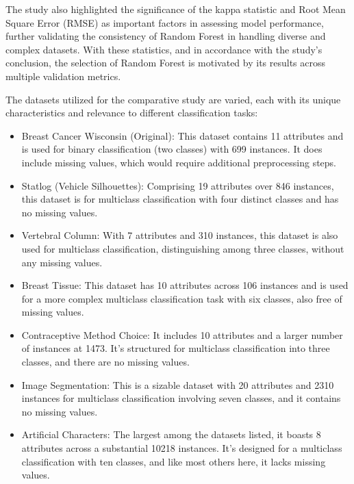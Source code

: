 The study \cite{siraj2023performanceModelComparison} also highlighted the significance of the kappa statistic and Root Mean Square Error (RMSE) as important factors in assessing model performance, further validating the consistency of Random Forest in handling diverse and complex datasets. With these statistics, and in accordance with the study’s conclusion, the selection of Random Forest is motivated by its results across multiple validation metrics.

The datasets utilized for the comparative study are varied, each with its unique characteristics and relevance to different classification tasks:
\begin{itemize}
 
\item Breast Cancer Wisconsin (Original): This dataset contains 11 attributes and is used for binary classification (two classes) with 699 instances. It does include missing values, which would require additional preprocessing steps.

\item Statlog (Vehicle Silhouettes): Comprising 19 attributes over 846 instances, this dataset is for multiclass classification with four distinct classes and has no missing values.

\item Vertebral Column: With 7 attributes and 310 instances, this dataset is also used for multiclass classification, distinguishing among three classes, without any missing values.

\item Breast Tissue: This dataset has 10 attributes across 106 instances and is used for a more complex multiclass classification task with six classes, also free of missing values.

\item Contraceptive Method Choice: It includes 10 attributes and a larger number of instances at 1473. It’s structured for multiclass classification into three classes, and there are no missing values.

\item Image Segmentation: This is a sizable dataset with 20 attributes and 2310 instances for multiclass classification involving seven classes, and it contains no missing values.

\item Artificial Characters: The largest among the datasets listed, it boasts 8 attributes across a substantial 10218 instances. It’s designed for a multiclass classification with ten classes, and like most others here, it lacks missing values.

\end{itemize}

